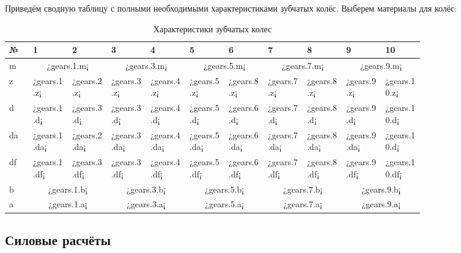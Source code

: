 \documentclass[14pt,a4paper,russian]{scrartcl}
\begin{document}
        Приведём сводную таблицу с полными необходимыми характеристиками зубчатых колёс.
        Выберем материалы для колёс:
        \begin{table}[h!]
            \begin{center}
                \begin{tabular}{p{0.04\linewidth}|p{0.075\linewidth}p{0.075\linewidth}p{0.075\linewidth}p{0.075\linewidth}p{0.075\linewidth}p{0.075\linewidth}p{0.075\linewidth}p{0.075\linewidth}p{0.075\linewidth}p{0.075\linewidth}}
                    \hline
                    №   & 1&2&3&4&5&6&7&8&9&10\\
                    \hline
                    m & \multicolumn{2}{c}{¿gears.1.m¡} & \multicolumn{2}{c}{¿gears.3.m¡} & \multicolumn{2}{c}{¿gears.5.m¡} & \multicolumn{2}{c}{¿gears.7.m¡} & \multicolumn{2}{c}{¿gears.9.m¡} \\
                    z & ¿gears.1.z¡ & ¿gears.2.z¡ & ¿gears.3.z¡ & ¿gears.4.z¡ & ¿gears.5.z¡ & ¿gears.8.z¡ & ¿gears.7.z¡ & ¿gears.8.z¡ & ¿gears.9.z¡ & ¿gears.10.z¡ \\
                    d & ¿gears.1.d¡ & ¿gears.3.d¡ & ¿gears.3.d¡ & ¿gears.4.d¡ & ¿gears.5.d¡ & ¿gears.6.d¡ & ¿gears.7.d¡ & ¿gears.8.d¡ & ¿gears.9.d¡ & ¿gears.10.d¡ \\
                    da & ¿gears.1.da¡ & ¿gears.2.da¡ & ¿gears.3.da¡ & ¿gears.4.da¡ & ¿gears.5.da¡ & ¿gears.6.da¡ & ¿gears.7.da¡ & ¿gears.8.da¡ & ¿gears.9.da¡ & ¿gears.10.d¡ \\
                    df & ¿gears.1.df¡ & ¿gears.3.df¡ & ¿gears.3.df¡ & ¿gears.4.df¡ & ¿gears.5.df¡ & ¿gears.6.df¡ & ¿gears.7.df¡ & ¿gears.8.df¡ & ¿gears.9.df¡ & ¿gears.10.df¡ \\
                    b & \multicolumn{2}{c}{¿gears.1.b¡} &  \multicolumn{2}{c}{¿gears.3.b¡} &  \multicolumn{2}{c}{¿gears.5.b¡} & \multicolumn{2}{c}{¿gears.7.b¡} &\multicolumn{2}{c}{¿gears.9.b¡} \\
                    a & \multicolumn{2}{c}{¿gears.1.a¡} & \multicolumn{2}{c}{¿gears.3.a¡} & \multicolumn{2}{c}{¿gears.5.a¡} & \multicolumn{2}{c}{¿gears.7.a¡} & \multicolumn{2}{c}{¿gears.9.a¡} \\
                    \hline
                \end{tabular}
                \caption{{Характеристики зубчатых колес}}\label{tab:gears_digest}
            \end{center}
        \end{table}

    
\subsection{Силовые расчёты}
\end{document}
